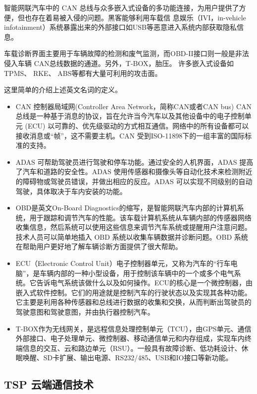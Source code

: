智能网联汽车中的 CAN 总线与众多嵌入式设备的多功能连接，为用户提供了方便，但也存在着易被入侵的问题。黑客能够利用车载信
息娱乐（IVI，in-vehicle infotainment）系统暴露出来的外部接口如USB等恶意进入系统内部获取隐私信息。

车载诊断界面主要用于车辆故障的检测和废气监测，而OBD-II接口则一般是非法侵入车辆 CAN总线数据的通道。另外，T-BOX，胎压。
许多嵌入式设备如 TPMS、 RKE、 ABS等都有大量可利用的攻击面。

这里简单的介绍上述英文名词的定义。
\begin{itemize}
    \item CAN 控制器局域网(Controller Area Network，简称CAN或者CAN bus) CAN 总线是一种基于消息的协议，旨在允许当今汽车以及其他设备中的电子控制单元 (ECU) 以可靠的、优先级驱动的方式相互通信。网络中的所有设备都可以接收消息或“帧”，这不需要主机。CAN 受到ISO-11898下的一组丰富的国际标准的支持。
    \item ADAS 可帮助驾驶员进行驾驶和停车功能。通过安全的人机界面，ADAS 提高了汽车和道路的安全性。ADAS 使用传感器和摄像头等自动化技术来检测附近的障碍物或驾驶员错误，并做出相应的反应。ADAS 可以实现不同级别的自动驾驶，具体取决于车内安装的功能。
    \item OBD是英文On-Board Diagnostics的缩写，是智能网联汽车内部的计算机系统，用于跟踪和调节汽车的性能。该车载计算机系统从车辆内部的传感器网络收集信息，然后系统可以使用这些信息来调节汽车系统或提醒用户注意问题。技术人员可以简单地插入 OBD 系统以收集车辆数据并诊断问题。OBD 系统在帮助用户更好地了解车辆诊断方面提供了很大帮助。
    \item ECU（Electronic Control Unit）电子控制器单元，又称为汽车的“行车电脑”，是车辆内部的一种小型设备，用于控制该车辆中的一个或多个电气系统。它告诉电气系统该做什么以及如何操作。ECU的核心是一个微控制器，由嵌入式软件控制。它们的用途就是控制汽车的行驶状态以及实现其各种功能。它主要是利用各种传感器和总线进行数据的收集和交换，从而判断出驾驶员的驾驶意图和驾驶意图，并由执行器控制汽车。
    \item T-BOX作为无线网关，是远程信息处理控制单元（TCU），由GPS单元、通信外部接口、电子处理单元、微控制器、移动通信单元和内存组成，实现车内终端信息的交互、云和路边单元（RSU）。一般具有故障诊断、低功耗设计、休眠唤醒、SD卡扩展、输出电源、RS232/485、USB和IO接口等新功能。
\end{itemize}
\subsection{TSP 云端通信技术}

